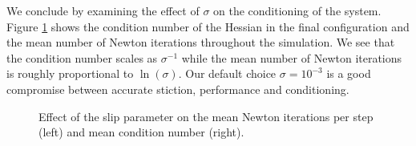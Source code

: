 We conclude by examining the effect of $\sigma$ on the conditioning of the
system. Figure \ref{fig:clutter_sigma} shows the condition number of the Hessian
in the final configuration and the mean number of Newton iterations throughout
the simulation. We see that the condition number scales as $\sigma^{-1}$ while
the mean number of Newton iterations is roughly proportional to  $\ln(\sigma)$.
Our default choice $\sigma=10^{-3}$ is a good compromise between accurate
stiction, performance and conditioning.
\begin{figure}[!h]
	\centering
	\caption{\label{fig:clutter_sigma} 
	Effect of the slip parameter on the mean Newton iterations per step (left)
	and mean condition number (right).}
\end{figure}
